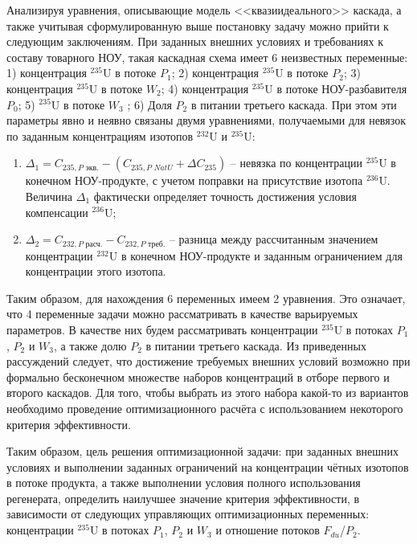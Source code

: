 Анализируя уравнения, описывающие модель <<квазиидеального>> каскада, а также учитывая сформулированную выше постановку задачу можно прийти к следующим заключениям. При заданных внешних условиях и требованиях к составу товарного НОУ, такая каскадная схема имеет 6 неизвестных переменные: 1) концентрация $^{235}$U в потоке $P_{1}$; 2) концентрация $^{235}$U в потоке $P_{2}$; 3) концентрация $^{235}$U в потоке $W_{2}$; 4) концентрация $^{235}$U в потоке НОУ-разбавителя $P_{0}$; 5) $^{235}$U в потоке $W_{3}$ ; 6) Доля $P_2$ в питании третьего каскада. При этом эти параметры явно и неявно связаны двумя уравнениями, получаемыми для невязок по заданным концентрациям изотопов $^{232}$U и $^{235}$U:

\begin{enumerate}
    \item $\Delta_{1}=C_{235,P\textit{ экв.}}-(C_{235,P\textit{ NatU}}+\Delta C_{235})$ -- невязка по концентрации $^{235}$U в конечном НОУ-продукте, с учетом поправки на присутствие изотопа $^{236}$U. Величина $\Delta_{1}$ фактически определяет точность достижения условия компенсации $^{236}$U;
    \item $\Delta_{2}=C_{232,P\textit{ расч.}}-C_{232,P\textit{ треб.}}$ -- разница между рассчитанным значением концентрации $^{232}$U в конечном НОУ-продукте и заданным ограничением для концентрации этого изотопа.
\end{enumerate}

Таким образом, для нахождения 6 переменных имеем 2 уравнения. Это означает, что 4 переменные задачи можно рассматривать в качестве варьируемых параметров. В качестве них будем рассматривать концентрации $^{235}$U в потоках $P_{1}$, $P_{2}$ и $W_{3}$, а также долю $P_2$ в питании третьего каскада. Из приведенных рассуждений следует, что достижение требуемых внешних условий возможно при формально бесконечном множестве наборов концентраций в отборе первого и второго каскадов. Для того, чтобы выбрать из этого набора какой-то из вариантов необходимо проведение оптимизационного расчёта с использованием некоторого критерия эффективности.

Таким образом, цель решения оптимизационной задачи: при заданных внешних условиях и выполнении заданных ограничений на концентрации чётных изотопов в потоке продукта, а также выполнении условия полного использования регенерата, определить наилучшее значение критерия эффективности, в зависимости от следующих управляющих оптимизационных переменных: концентрации $^{235}$U в потоках $P_1$, $P_2$ и $W_3$ и отношение потоков $F_{du}$/$P_2$.


